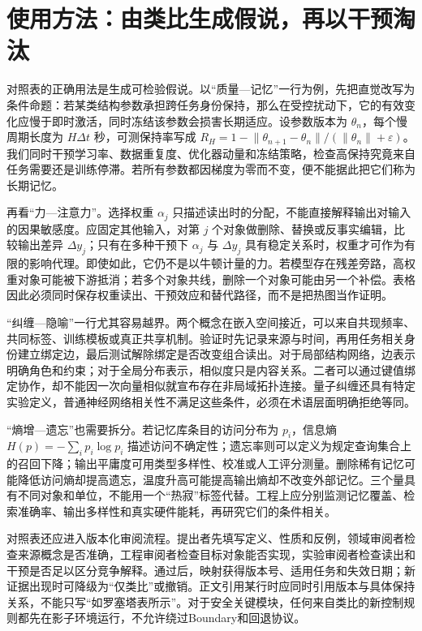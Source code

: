 \section{使用方法：由类比生成假说，再以干预淘汰}

对照表的正确用法是生成可检验假说。以“质量—记忆”一行为例，先把直觉改写为条件命题：若某类结构参数承担跨任务身份保持，那么在受控扰动下，它的有效变化应慢于即时激活，同时冻结该参数会损害长期适应。设参数版本为 $\theta_n$，每个慢周期长度为 $H\Delta t$ 秒，可测保持率写成 $R_H=1-\lVert\theta_{n+1}-\theta_n\rVert/(\lVert\theta_n\rVert+\varepsilon)$。我们同时干预学习率、数据重复度、优化器动量和冻结策略，检查高保持究竟来自任务需要还是训练停滞。若所有参数都因梯度为零而不变，便不能据此把它们称为长期记忆。

再看“力—注意力”。选择权重 $\alpha_j$ 只描述读出时的分配，不能直接解释输出对输入的因果敏感度。应固定其他输入，对第 $j$ 个对象做删除、替换或反事实编辑，比较输出差异 $\Delta y_j$；只有在多种干预下 $\alpha_j$ 与 $\Delta y_j$ 具有稳定关系时，权重才可作为有限的影响代理。即使如此，它仍不是以牛顿计量的力。若模型存在残差旁路，高权重对象可能被下游抵消；若多个对象共线，删除一个对象可能由另一个补偿。表格因此必须同时保存权重读出、干预效应和替代路径，而不是把热图当作证明。

“纠缠—隐喻”一行尤其容易越界。两个概念在嵌入空间接近，可以来自共现频率、共同标签、训练模板或真正共享机制。验证时先记录来源与时间，再用任务相关身份建立绑定边，最后测试解除绑定是否改变组合读出。对于局部结构网络，边表示明确角色和约束；对于全局分布表示，相似度只是内容关系。二者可以通过键值绑定协作，却不能因一次向量相似就宣布存在非局域拓扑连接。量子纠缠还具有特定实验定义，普通神经网络相关性不满足这些条件，必须在术语层面明确拒绝等同。

“熵增—遗忘”也需要拆分。若记忆库条目的访问分布为 $p_i$，信息熵 $H(p)=-\sum_i p_i\log p_i$ 描述访问不确定性；遗忘率则可以定义为规定查询集合上的召回下降；输出平庸度可用类型多样性、校准或人工评分测量。删除稀有记忆可能降低访问熵却提高遗忘，温度升高可能提高输出熵却不改变外部记忆。三个量具有不同对象和单位，不能用一个“热寂”标签代替。工程上应分别监测记忆覆盖、检索准确率、输出多样性和真实硬件能耗，再研究它们的条件相关。

对照表还应进入版本化审阅流程。提出者先填写定义、性质和反例，领域审阅者检查来源概念是否准确，工程审阅者检查目标对象能否实现，实验审阅者检查读出和干预是否足以区分竞争解释。通过后，映射获得版本号、适用任务和失效日期；新证据出现时可降级为“仅类比”或撤销。正文引用某行时应同时引用版本与具体保持关系，不能只写“如罗塞塔表所示”。对于安全关键模块，任何来自类比的新控制规则都先在影子环境运行，不允许绕过Boundary和回退协议。

